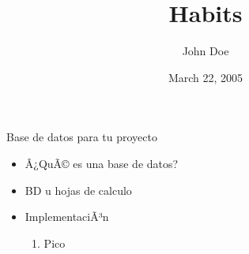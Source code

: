 \documentclass[ignorenonframetext,]{beamer}
\title{Habits}
\author{John Doe}
\date{March 22, 2005}
\providecommand{\tightlist}{%
  \setlength{\itemsep}{0pt}\setlength{\parskip}{0pt}}
\begin{document}
\frame{\titlepage}

\begin{frame}{Base de datos para tu proyecto}

\begin{itemize}
\tightlist
\item
  Â¿QuÃ© es una base de datos?
\item
  BD u hojas de calculo
\item
  ImplementaciÃ³n

  \begin{enumerate}
  \def\labelenumi{\arabic{enumi}.}
  \tightlist
  \item
    Pico
  \end{enumerate}
\end{itemize}

\end{frame}
\end{document}
